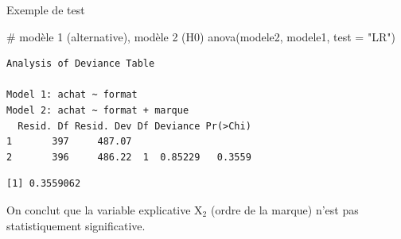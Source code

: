 \documentclass[
  ignorenonframetext,
]{beamer}
\newenvironment{Shaded}{\begin{snugshade}}{\end{snugshade}}
\newcommand{\AttributeTok}[1]{\textcolor[rgb]{0.40,0.45,0.13}{#1}}
\newcommand{\CommentTok}[1]{\textcolor[rgb]{0.37,0.37,0.37}{#1}}
\newcommand{\ConstantTok}[1]{\textcolor[rgb]{0.56,0.35,0.01}{#1}}
\newcommand{\DecValTok}[1]{\textcolor[rgb]{0.68,0.00,0.00}{#1}}
\newcommand{\DocumentationTok}[1]{\textcolor[rgb]{0.37,0.37,0.37}{\textit{#1}}}
\newcommand{\FunctionTok}[1]{\textcolor[rgb]{0.28,0.35,0.67}{#1}}
\newcommand{\NormalTok}[1]{\textcolor[rgb]{0.00,0.23,0.31}{#1}}
\newcommand{\OtherTok}[1]{\textcolor[rgb]{0.00,0.23,0.31}{#1}}
\newcommand{\SpecialCharTok}[1]{\textcolor[rgb]{0.37,0.37,0.37}{#1}}
\newcommand{\StringTok}[1]{\textcolor[rgb]{0.13,0.47,0.30}{#1}}
\begin{document}
\begin{frame}[fragile]{Exemple de test}
\protect{}\label{exemple-de-test}
\footnotesize

\begin{Shaded}
\begin{Highlighting}[numbers=left,,]
\CommentTok{\# modèle 1 (alternative), modèle 2 (H0)}
\FunctionTok{anova}\NormalTok{(modele2, modele1, }\AttributeTok{test =} \StringTok{"LR"}\NormalTok{)}
\end{Highlighting}
\end{Shaded}

\begin{verbatim}
Analysis of Deviance Table

Model 1: achat ~ format
Model 2: achat ~ format + marque
  Resid. Df Resid. Dev Df Deviance Pr(>Chi)
1       397     487.07                     
2       396     486.22  1  0.85229   0.3559
\end{verbatim}

\begin{Shaded}
\end{Shaded}

\begin{verbatim}
[1] 0.3559062
\end{verbatim}

\normalsize

On conclut que la variable explicative \(\mathrm{X}_2\) (ordre de la
marque) n'est pas statistiquement significative.
\end{frame}
\end{document}
